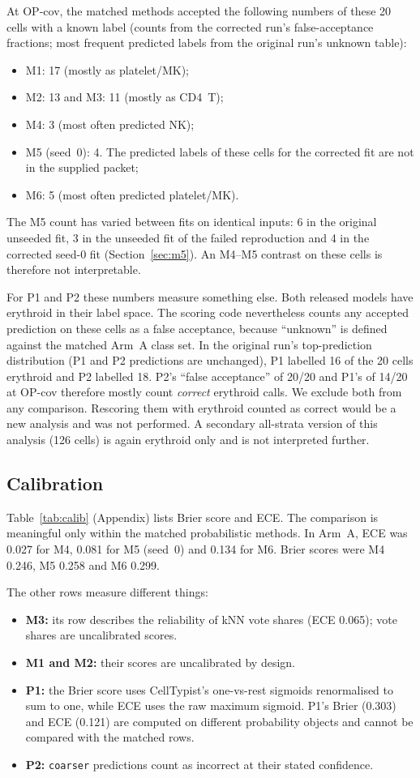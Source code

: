 \documentclass[11pt]{article}
\begin{document}
At OP-cov, the matched methods accepted the following numbers of these 20 cells with a known label (counts from the corrected run's false-acceptance fractions; most frequent predicted labels from the original run's unknown table):
\begin{itemize}
\item M1: 17 (mostly as platelet/MK);
\item M2: 13 and M3: 11 (mostly as CD4~T);
\item M4: 3 (most often predicted NK);
\item M5 (seed~0): 4. The predicted labels of these cells for the corrected fit are not in the supplied packet;
\item M6: 5 (most often predicted platelet/MK).
\end{itemize}
The M5 count has varied between fits on identical inputs: 6 in the original unseeded fit, 3 in the unseeded fit of the failed reproduction and 4 in the corrected seed-0 fit (Section~\ref{sec:m5}). An M4--M5 contrast on these cells is therefore not interpretable.

For P1 and P2 these numbers measure something else. Both released models have erythroid in their label space. The scoring code nevertheless counts any accepted prediction on these cells as a false acceptance, because ``unknown'' is defined against the matched Arm~A class set. In the original run's top-prediction distribution (P1 and P2 predictions are unchanged), P1 labelled 16 of the 20 cells erythroid and P2 labelled 18. P2's ``false acceptance'' of 20/20 and P1's of 14/20 at OP-cov therefore mostly count \emph{correct} erythroid calls. We exclude both from any comparison. Rescoring them with erythroid counted as correct would be a new analysis and was not performed. A secondary all-strata version of this analysis (126 cells) is again erythroid only and is not interpreted further.

\subsection{Calibration}

Table~\ref{tab:calib} (Appendix) lists Brier score and ECE. The comparison is meaningful only within the matched probabilistic methods. In Arm~A, ECE was 0.027 for M4, 0.081 for M5 (seed~0) and 0.134 for M6. Brier scores were M4 0.246, M5 0.258 and M6 0.299.

The other rows measure different things:
\begin{itemize}
\item \textbf{M3:} its row describes the reliability of kNN vote shares (ECE 0.065); vote shares are uncalibrated scores.
\item \textbf{M1 and M2:} their scores are uncalibrated by design.
\item \textbf{P1:} the Brier score uses CellTypist's one-vs-rest sigmoids renormalised to sum to one, while ECE uses the raw maximum sigmoid. P1's Brier (0.303) and ECE (0.121) are computed on different probability objects and cannot be compared with the matched rows.
\item \textbf{P2:} \texttt{coarser} predictions count as incorrect at their stated confidence.
\end{itemize}
\end{document}
